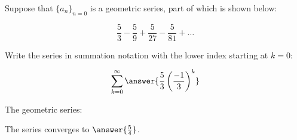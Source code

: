 \documentclass{ximera}
\author{Jim Talamo}
\begin{document}
\begin{exercise}
Suppose that $\{a_n\}_{n=0}$ is a geometric series, part of which is shown below:

\[
\frac{5}{3} - \frac{5}{9} + \frac{5}{27} - \frac{5}{81} + \ldots
\]

Write the series in summation notation with the lower index starting at $k=0$:

\[
\sum_{k=0}^{\infty} \answer{\frac{5}{3} \left(\frac{-1}{3}\right)^k}
\]

\begin{exercise}
The geometric series:

\begin{multipleChoice}
\end{multipleChoice}

\begin{exercise}
The series converges to $\answer{\frac{5}{4}}$.
\end{exercise}
\end{exercise}
\end{exercise}
\end{document}
